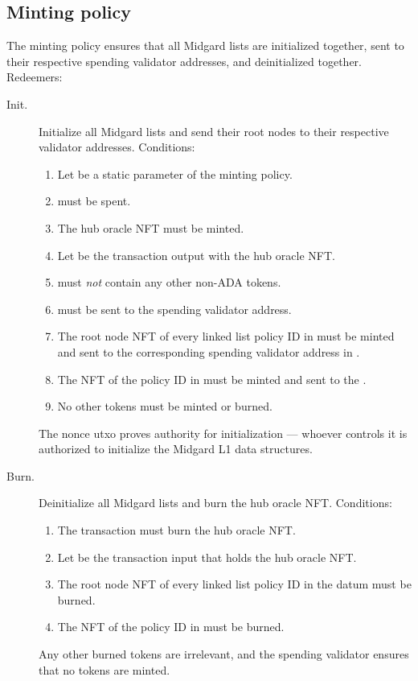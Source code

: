 \documentclass[../midgard.tex]{subfiles}
\begin{document}
\subsection{Minting policy}
\label{h:hub-oracle-minting-policy}

The  minting policy ensures that all Midgard lists are initialized together, sent to their respective spending validator addresses, and deinitialized together.
Redeemers:
\begin{description}
    \item[Init.] Initialize all Midgard lists and send their root nodes to their respective validator addresses.
      Conditions:
        \begin{enumerate}
            \item Let  be a static parameter of the  minting policy.
            \item {} must be spent.
            \item The hub oracle NFT must be minted.
            \item Let  be the transaction output with the hub oracle NFT.
            \item {} must \emph{not} contain any other non-ADA tokens.
            \item {} must be sent to the  spending validator address.
            \item The root node NFT of every linked list policy ID in  must be minted and sent to the corresponding spending validator address in .
            \item The NFT of the  policy ID in  must be minted and sent to the .
            \item No other tokens must be minted or burned.
        \end{enumerate}
    The nonce utxo proves authority for initialization --- whoever controls it is authorized to initialize the Midgard L1 data structures.
    
    \item[Burn.] Deinitialize all Midgard lists and burn the hub oracle NFT.
      Conditions:
        \begin{enumerate}
            \item The transaction must burn the hub oracle NFT.
            \item Let  be the transaction input that holds the hub oracle NFT.
            \item The root node NFT of every linked list policy ID in the  datum must be burned.
            \item The NFT of the  policy ID in  must be burned.
        \end{enumerate}
    Any other burned tokens are irrelevant, and the  spending validator ensures that no tokens are minted.
\end{description}
\end{document}
